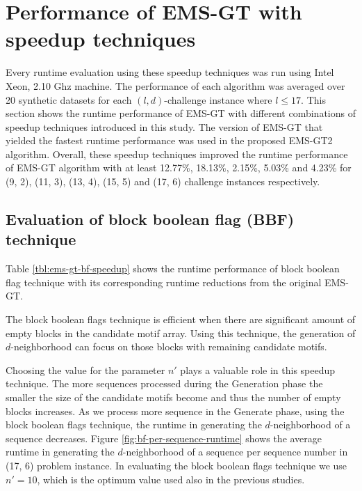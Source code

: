 \section{Performance of EMS-GT with speedup techniques}
Every runtime evaluation using these speedup techniques was run using Intel Xeon, 2.10 Ghz machine. The performance of each algorithm was averaged over 20 synthetic datasets for each $(l, d)$-challenge instance where $l \leq 17$. This section shows the runtime performance of EMS-GT with different combinations of speedup techniques introduced in this study. The version of EMS-GT that yielded the fastest runtime performance was used in the proposed EMS-GT2 algorithm. Overall, these speedup techniques improved the runtime performance of EMS-GT algorithm with at least 12.77\%, 18.13\%, 2.15\%, 5.03\% and 4.23\% for (9, 2), (11, 3), (13, 4), (15, 5) and (17, 6) challenge instances respectively. 



	\subsection{Evaluation of block boolean flag (BBF) technique}
	Table \ref{tbl:ems-gt-bf-speedup} shows the runtime performance of block boolean flag technique with its corresponding runtime reductions from the original EMS-GT.

	

	The block boolean flags technique is efficient when there are significant amount of empty blocks in the candidate motif array. Using this technique, the generation of $d$-neighborhood can focus on those blocks with remaining candidate motifs. 

	Choosing the value for the parameter $n'$ plays a valuable role in this speedup technique. The more sequences processed during the Generation phase the smaller the size of the candidate motifs become and thus the number of empty blocks increases. As we process more sequence in the Generate phase, using the block boolean flags technique, the runtime in generating the $d$-neighborhood of a sequence decreases. Figure \ref{fig:bf-per-sequence-runtime} shows the average runtime in generating the $d$-neighborhood of a sequence per sequence number in (17, 6) problem instance. In evaluating the block boolean flags technique we use $n'=10$, which is the optimum value used also in the previous studies.

